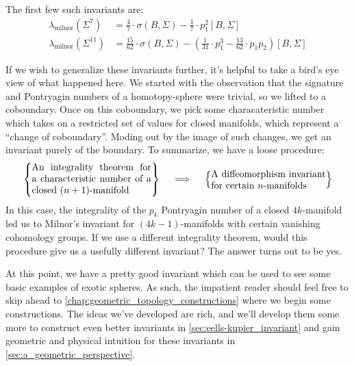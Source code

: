 \begin{example}
	The first few such invariants are:
	\[
		\begin{aligned}
			\lambda_{\mathrm{milnor}}(\Sigma^7)    
			& = \frac{4}{7}\cdot \sigma(B, \Sigma) - \frac{1}{7}\cdot p_1^2[B, \Sigma]\\
			\lambda_{\mathrm{milnor}}(\Sigma^{11})    
			&= \frac{15}{62}\cdot \sigma(B,\Sigma) - \left(\frac{1}{31}\cdot p_1^3-\frac{13}{62}\cdot p_1p_2\right)[B,\Sigma]
		\end{aligned}
	\]
\end{example}

If we wish to generalize these invariants further, it's helpful to take a bird's eye view of what happened here. We started with the observation that the signature and Pontryagin numbers of a homotopy-sphere were trivial, so we lifted to a coboundary. Once on this coboundary, we pick some characateristic number which takes on a restricted set of values for closed manifolds, which represent a ``change of coboundary''. Moding out by the image of such changes, we get an invariant purely of the boundary. To summarize, we have a loose procedure:
\[
	\left\{\parbox{12.5em}{An integrality theorem for a characteristic number of a closed $(n+1)$-manifold}\right\}
	\quad\implies \quad
	\left\{\parbox{12em}{A diffeomorphism invariant for certain $n$-manifolds}\right\}
\]
In this case, the integrality of the $p_k$ Pontryagin number of a closed $4k$-manifold led us to Milnor's invariant for $(4k-1)$-manifolds with certain vanishing cohomology groups.
If we use a different integrality theorem, would this procedure give us a usefully different invariant? The answer turns out to be yes.

At this point, we have a pretty good invariant which can be used to see some basic examples of exotic spheres. As such, the impatient reader should feel free to skip ahead to \cref{chap:geometric_topology_constructions} where we begin some constructions. The ideas we've developed are rich, and we'll develop them some more to construct even better invariants in \cref{sec:eells-kupier_invariant} and gain geometric and physical intuition for these invariants in \cref{sec:a_geometric_perspective}.

